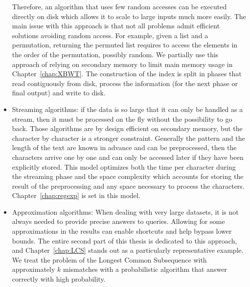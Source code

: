 \begin{itemize}
Therefore, an algorithm that uses few random accesses can be executed directly on disk which allows it to scale to large inputs much more easily. The main issue with this approach is that not all problems admit efficient solutions avoiding random access. For example, given a list and a permutation, returning the permuted list requires to access the elements in the order of the permutation, possibly random. We partially use this approach of relying on secondary memory to limit main memory usage in Chapter~\ref{chap:XBWT}. The construction of the index is split in phases that read contiguously from disk, process the information (for the next phase or final output) and write to disk.
\item Streaming algorithms: if the data is so large that it can only be handled as a stream, then it must be processed on the fly without the possibility to go back. Those algorithms are by design efficient on secondary memory, but the character by character is a stronger constraint. Generally the pattern and the length of the text are known in advance and can be preprocessed, then the characters arrive one by one and can only be accessed later if they have been explicitly stored. This model optimizes both the time per character during the streaming phase and the space complexity which accounts for storing the result of the preprocessing and any space necessary to process the characters. Chapter~\ref{chap:regexp} is set in this model. %
\item Approximation algorithms: When dealing with very large datasets, it is not always needed to provide precise answers to queries. Allowing for some approximations in the results can enable shortcuts and help bypass lower bounds.
The entire second part of this thesis is dedicated to this approach, and Chapter~\ref{chap:LCS} stands out as a particularly representative example. We treat the problem of the Longest Common Subsequence with approximately $k$ mismatches with a probabilistic algorithm that answer correctly with high probability. %
\end{itemize}
